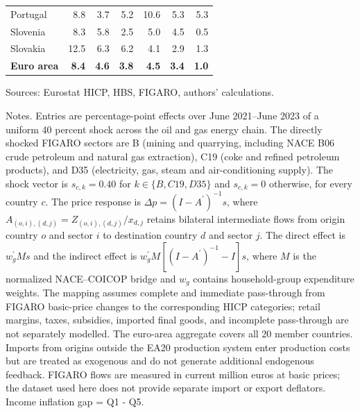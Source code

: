\begin{table}[H]
\begin{tabular}{lrrrrrr}
 \\
Portugal & 8.8 & 3.7 & 5.2 & 10.6 & 5.3 & 5.3
 \\
Slovenia & 8.3 & 5.8 & 2.5 & 5.0 & 4.5 & 0.5
 \\
Slovakia & 12.5 & 6.3 & 6.2 & 4.1 & 2.9 & 1.3
 \\
\midrule
\textbf{Euro area} & \textbf{8.4} & \textbf{4.6} & \textbf{3.8} & \textbf{4.5} & \textbf{3.4} & \textbf{1.0}
 \\
\bottomrule
\end{tabular}
\par\vspace{0.35em}\footnotesize\noindent Sources: Eurostat HICP, HBS, FIGARO, authors' calculations.
\par\vspace{0.25em}\footnotesize\noindent Notes. Entries are percentage-point effects over June 2021--June 2023 of a uniform 40 percent shock across the oil and gas energy chain. The directly shocked FIGARO sectors are B (mining and quarrying, including NACE B06 crude petroleum and natural gas extraction), C19 (coke and refined petroleum products), and D35 (electricity, gas, steam and air-conditioning supply). The shock vector is $s_{c,k}=0.40$ for $k\in\{B,C19,D35\}$ and $s_{c,k}=0$ otherwise, for every country $c$. The price response is $\Delta p = (I - A^{\prime})^{-1}s$, where $A_{(o,i),(d,j)}=Z_{(o,i),(d,j)}/x_{d,j}$ retains bilateral intermediate flows from origin country $o$ and sector $i$ to destination country $d$ and sector $j$. The direct effect is $w_g^{\prime}Ms$ and the indirect effect is $w_g^{\prime}M[(I-A^{\prime})^{-1}-I]s$, where $M$ is the normalized NACE--COICOP bridge and $w_g$ contains household-group expenditure weights. The mapping assumes complete and immediate pass-through from FIGARO basic-price changes to the corresponding HICP categories; retail margins, taxes, subsidies, imported final goods, and incomplete pass-through are not separately modelled. The euro-area aggregate covers all 20 member countries. Imports from origins outside the EA20 production system enter production costs but are treated as exogenous and do not generate additional endogenous feedback. FIGARO flows are measured in current million euros at basic prices; the dataset used here does not provide separate import or export deflators. Income inflation gap = Q1 - Q5.
\end{table}
\vspace{0.6em}
